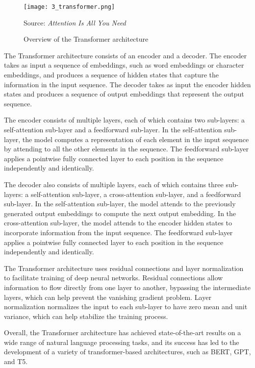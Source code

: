 \begin{figure}[h]
	\centering
	\texttt{[image: 3\_transformer.png]}
	\caption{Overview of the Transformer architecture}
	Source: \textit{Attention Is All You Need} \cite{vaswani2017attention}
	\label{fig:3_transformer}
\end{figure}

The Transformer architecture consists of an encoder and a decoder. The encoder takes as input a sequence of embeddings, such as word embeddings or character embeddings, and produces a sequence of hidden states that capture the information in the input sequence. The decoder takes as input the encoder hidden states and produces a sequence of output embeddings that represent the output sequence.

The encoder consists of multiple layers, each of which contains two sub-layers: a self-attention sub-layer and a feedforward sub-layer. In the self-attention sub-layer, the model computes a representation of each element in the input sequence by attending to all the other elements in the sequence. The feedforward sub-layer applies a pointwise fully connected layer to each position in the sequence independently and identically.

The decoder also consists of multiple layers, each of which contains three sub-layers: a self-attention sub-layer, a cross-attention sub-layer, and a feedforward sub-layer. In the self-attention sub-layer, the model attends to the previously generated output embeddings to compute the next output embedding. In the cross-attention sub-layer, the model attends to the encoder hidden states to incorporate information from the input sequence. The feedforward sub-layer applies a pointwise fully connected layer to each position in the sequence independently and identically.

The Transformer architecture uses residual connections and layer normalization to facilitate training of deep neural networks. Residual connections allow information to flow directly from one layer to another, bypassing the intermediate layers, which can help prevent the vanishing gradient problem. Layer normalization normalizes the input to each sub-layer to have zero mean and unit variance, which can help stabilize the training process.

Overall, the Transformer architecture has achieved state-of-the-art results on a wide range of natural language processing tasks, and its success has led to the development of a variety of transformer-based architectures, such as BERT, GPT, and T5.

